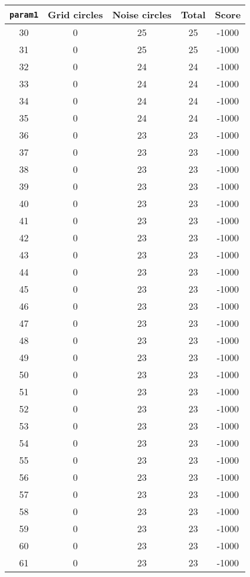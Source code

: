 \documentclass[letterpaper, 12pt]{article}
\begin{document}
\begin{longtable}{|c|c|c|c|c|}
\hline
\textbf{\texttt{param1}} & \textbf{Grid circles} & \textbf{Noise circles} & \textbf{Total} & \textbf{Score} \\
\hline
30 & 0 & 25 & 25 & -1000 \\
\hline
31 & 0 & 25 & 25 & -1000 \\
\hline
32 & 0 & 24 & 24 & -1000 \\
\hline
33 & 0 & 24 & 24 & -1000 \\
\hline
34 & 0 & 24 & 24 & -1000 \\
\hline
35 & 0 & 24 & 24 & -1000 \\
\hline
36 & 0 & 23 & 23 & -1000 \\
\hline
37 & 0 & 23 & 23 & -1000 \\
\hline
38 & 0 & 23 & 23 & -1000 \\
\hline
39 & 0 & 23 & 23 & -1000 \\
\hline
40 & 0 & 23 & 23 & -1000 \\
\hline
41 & 0 & 23 & 23 & -1000 \\
\hline
42 & 0 & 23 & 23 & -1000 \\
\hline
43 & 0 & 23 & 23 & -1000 \\
\hline
44 & 0 & 23 & 23 & -1000 \\
\hline
45 & 0 & 23 & 23 & -1000 \\
\hline
46 & 0 & 23 & 23 & -1000 \\
\hline
47 & 0 & 23 & 23 & -1000 \\
\hline
48 & 0 & 23 & 23 & -1000 \\
\hline
49 & 0 & 23 & 23 & -1000 \\
\hline
50 & 0 & 23 & 23 & -1000 \\
\hline
51 & 0 & 23 & 23 & -1000 \\
\hline
52 & 0 & 23 & 23 & -1000 \\
\hline
53 & 0 & 23 & 23 & -1000 \\
\hline
54 & 0 & 23 & 23 & -1000 \\
\hline
55 & 0 & 23 & 23 & -1000 \\
\hline
56 & 0 & 23 & 23 & -1000 \\
\hline
57 & 0 & 23 & 23 & -1000 \\
\hline
58 & 0 & 23 & 23 & -1000 \\
\hline
59 & 0 & 23 & 23 & -1000 \\
\hline
60 & 0 & 23 & 23 & -1000 \\
\hline
61 & 0 & 23 & 23 & -1000 \\

\end{longtable}
\end{document}
